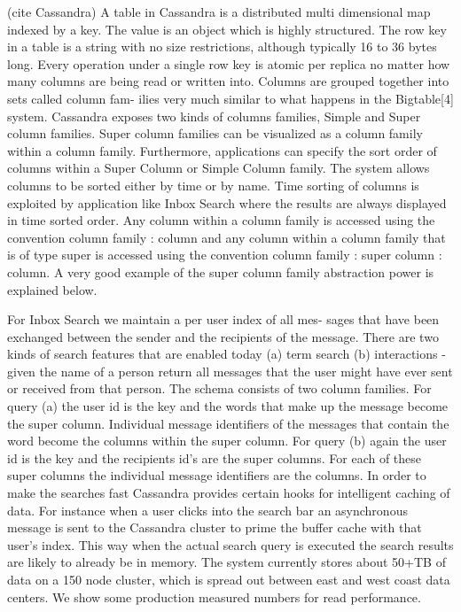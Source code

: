 (cite Cassandra) A table in Cassandra is a distributed multi dimensional map indexed by a key. The value is an object which is highly structured. The row key in a table is a string with no size restrictions, although typically 16 to 36 bytes long. Every operation under a single row key is atomic per replica no matter how many columns are being read or written into. Columns are grouped together into sets called column fam- ilies very much similar to what happens in the Bigtable[4] system. Cassandra exposes two kinds of columns families, Simple and Super column families. Super column families can be visualized as a column family within a column family.
Furthermore, applications can specify the sort order of columns within a Super Column or Simple Column family. The system allows columns to be sorted either by time or by name. Time sorting of columns is exploited by application like Inbox Search where the results are always displayed in time sorted order. Any column within a column family is accessed using the convention column family : column and any column within a column family that is of type super is accessed using the convention column family : super column : column. A very good example of the super column family abstraction power is explained below.

For Inbox Search we maintain a per user index of all mes- sages that have been exchanged between the sender and the recipients of the message. There are two kinds of search features that are enabled today (a) term search (b) interactions - given the name of a person return all messages that the user might have ever sent or received from that person. The schema consists of two column families. For query (a) the user id is the key and the words that make up the message become the super column. Individual message identifiers of the messages that contain the word become the columns within the super column. For query (b) again the user id is the key and the recipients id's are the super columns. For each of these super columns the individual message identifiers are the columns. In order to make the searches fast Cassandra provides certain hooks for intelligent caching of data. For instance when a user clicks into the search bar an asynchronous message is sent to the Cassandra cluster to prime the buffer cache with that user's index. This way when the actual search query is executed the search results are likely to already be in memory. The system currently stores about 50+TB of data on a 150 node cluster, which is spread out between east and west coast data centers. We show some production measured numbers for read performance.

